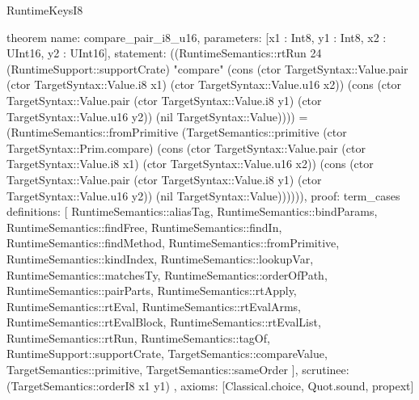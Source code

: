 \begin{lexlean}{RuntimeKeysI8}
\begin{semanticmodule}
theorem{
  name: compare_pair_i8_u16,
  parameters: [x1 : Int8, y1 : Int8, x2 : UInt16, y2 : UInt16],
  statement: ((RuntimeSemantics::rtRun 24 (RuntimeSupport::supportCrate) "compare" (cons (ctor TargetSyntax::Value.pair (ctor TargetSyntax::Value.i8 x1) (ctor TargetSyntax::Value.u16 x2)) (cons (ctor TargetSyntax::Value.pair (ctor TargetSyntax::Value.i8 y1) (ctor TargetSyntax::Value.u16 y2)) (nil TargetSyntax::Value)))) = (RuntimeSemantics::fromPrimitive (TargetSemantics::primitive (ctor TargetSyntax::Prim.compare) (cons (ctor TargetSyntax::Value.pair (ctor TargetSyntax::Value.i8 x1) (ctor TargetSyntax::Value.u16 x2)) (cons (ctor TargetSyntax::Value.pair (ctor TargetSyntax::Value.i8 y1) (ctor TargetSyntax::Value.u16 y2)) (nil TargetSyntax::Value)))))),
  proof: term_cases{
    definitions: [
      RuntimeSemantics::aliasTag,
      RuntimeSemantics::bindParams,
      RuntimeSemantics::findFree,
      RuntimeSemantics::findIn,
      RuntimeSemantics::findMethod,
      RuntimeSemantics::fromPrimitive,
      RuntimeSemantics::kindIndex,
      RuntimeSemantics::lookupVar,
      RuntimeSemantics::matchesTy,
      RuntimeSemantics::orderOfPath,
      RuntimeSemantics::pairParts,
      RuntimeSemantics::rtApply,
      RuntimeSemantics::rtEval,
      RuntimeSemantics::rtEvalArms,
      RuntimeSemantics::rtEvalBlock,
      RuntimeSemantics::rtEvalList,
      RuntimeSemantics::rtRun,
      RuntimeSemantics::tagOf,
      RuntimeSupport::supportCrate,
      TargetSemantics::compareValue,
      TargetSemantics::primitive,
      TargetSemantics::sameOrder
    ],
    scrutinee: (TargetSemantics::orderI8 x1 y1)
  },
  axioms: [Classical.choice, Quot.sound, propext]
}


\end{semanticmodule}
\end{lexlean}
